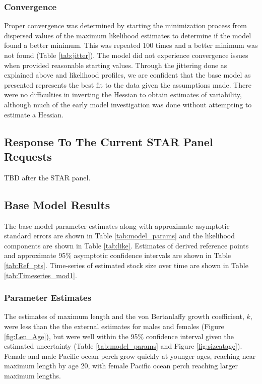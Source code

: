 \documentclass[12pt,]{article}
\begin{document}
\subsubsection{Convergence}\label{convergence}

Proper convergence was determined by starting the minimization process
from dispersed values of the maximum likelihood estimates to determine
if the model found a better minimum. This was repeated 100 times and a
better minimum was not found (Table \ref{tab:jitter}). The model did not
experience convergence issues when provided reasonable starting values.
Through the jittering done as explained above and likelihood profiles,
we are confident that the base model as presented represents the best
fit to the data given the assumptions made. There were no difficulties
in inverting the Hessian to obtain estimates of variability, although
much of the early model investigation was done without attempting to
estimate a Hessian.

\subsection{Response To The Current STAR Panel
Requests}\label{response-to-the-current-star-panel-requests}

TBD after the STAR panel.

\subsection{Base Model Results}\label{base-model-results}

The base model parameter estimates along with approximate asymptotic
standard errors are shown in Table \ref{tab:model_params} and the
likelihood components are shown in Table \ref{tab:like}. Estimates of
derived reference points and approximate 95\% asymptotic confidence
intervals are shown in Table \ref{tab:Ref_pts}. Time-series of estimated
stock size over time are shown in Table \ref{tab:Timeseries_mod1}.

\subsubsection{Parameter Estimates}\label{parameter-estimates}

The estimates of maximum length and the von Bertanlaffy growth
coefficient, \(k\), were less than the the external estimates for males
and females (Figure \ref{fig:Len_Age}), but were well within the 95\%
confidence interval given the estimated uncertainty (Table
\ref{tab:model_params} and Figure \ref{fig:sizeatage}). Female and male
Pacific ocean perch grow quickly at younger ages, reaching near maximum
length by age 20, with female Pacific ocean perch reaching larger
maximum lengths.
\end{document}
